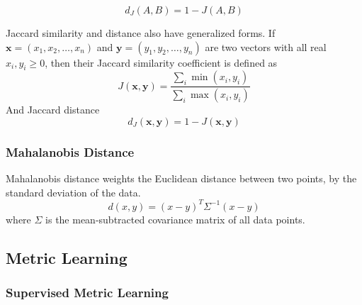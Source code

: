 $$ d_J(A,B) = 1 - J(A,B) $$

Jaccard similarity and distance also have generalized forms. If
$\mathbf{x} = (x_1, x_2, \ldots, x_n)$ and $\mathbf{y} = (y_1, y_2, \ldots, y_n)$
are two vectors with all real $x_i, y_i \geq 0$, then their Jaccard similarity
coefficient is defined as
$$ J(\mathbf{x},\mathbf{y}) = \frac{
	\sum_i \min(x_i,y_i)}{\sum_i \max(x_i,y_i)} $$
And Jaccard distance
$$ d_J(\mathbf{x}, \mathbf{y}) = 1 - J(\mathbf{x},\mathbf{y}) $$

\subsubsection{Mahalanobis Distance}

Mahalanobis distance weights the Euclidean distance between two points, by the
standard deviation of the data.
$$d(x,y) = (x-y)^T \Sigma^{-1}(x-y)$$
where $\Sigma$ is the mean-subtracted covariance matrix of all data points.


\subsection{Metric Learning}

\subsubsection{Supervised Metric Learning}


